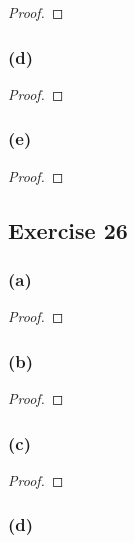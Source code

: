 \documentclass[14pt]{extarticle}
\begin{document}
\begin{proof}

\end{proof}

\subsubsection{(d)}

\begin{proof}

\end{proof}

\subsubsection{(e)}

\begin{proof}

\end{proof}

\subsection{Exercise 26}

\subsubsection{(a)}

\begin{proof}

\end{proof}

\subsubsection{(b)}

\begin{proof}

\end{proof}

\subsubsection{(c)}

\begin{proof}

\end{proof}

\subsubsection{(d)}
\end{document}
